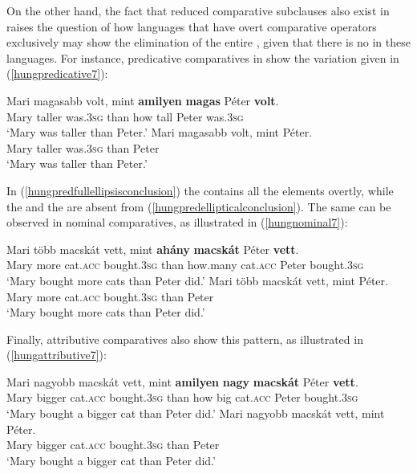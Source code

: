 On the other hand, the fact that reduced comparative subclauses also exist in  raises the question of how languages that have overt comparative operators exclusively may show the elimination of the entire , given that there is no  in these languages. For instance, predicative comparatives in  show the variation given in (\ref{hungpredicative7}):

\ea \label{hungpredicative7}
\ea \gll	Mari	magasabb volt, mint \textbf{amilyen} \textbf{magas} Péter \textbf{volt}. \label{hungpredfullellipsisconclusion}\\
Mary taller	was.\textsc{3sg} than	how	tall	Peter was.\textsc{3sg}\\
\glt `Mary was taller than Peter.'
\ex	\gll Mari	magasabb volt, mint	Péter. \label{hungpredellipticalconclusion}\\
Mary taller	was.\textsc{3sg} than	Peter\\
\glt `Mary was taller than Peter.'
\z
\z

In (\ref{hungpredfullellipsisconclusion}) the  contains all the elements overtly, while the  and the  are absent from (\ref{hungpredellipticalconclusion}). The same can be observed in nominal comparatives, as illustrated in (\ref{hungnominal7}):

\ea \label{hungnominal7}
\ea \gll Mari	több macskát vett, mint	\textbf{ahány} \textbf{macskát} Péter \textbf{vett}.\\
Mary more	cat.\textsc{acc} bought.\textsc{3sg} than	how.many cat.\textsc{acc} Peter bought.\textsc{3sg}\\
\glt `Mary bought more cats than Peter did.'
\ex \gll Mari	több macskát vett, mint	Péter. \label{hungnomellipticalconclusion}\\
Mary more	cat.\textsc{acc} bought.\textsc{3sg} than Peter\\
\glt `Mary bought more cats than Peter did.'
\z
\z

Finally, attributive comparatives also show this pattern, as illustrated in (\ref{hungattributive7}):

\ea \label{hungattributive7}
\ea	\gll Mari nagyobb macskát vett, mint \textbf{amilyen} \textbf{nagy} \textbf{macskát} Péter \textbf{vett}.\\
Mary bigger	cat.\textsc{acc} bought.\textsc{3sg} than how big cat.\textsc{acc} Peter bought.\textsc{3sg}\\
\glt `Mary bought a bigger cat than Peter did.'
\ex \gll Mari nagyobb	macskát	vett,	mint Péter. \label{hungattrellipticalconclusion}\\
Mary bigger	cat.\textsc{acc} bought.\textsc{3sg} than	Peter\\
\glt `Mary bought a bigger cat than Peter did.'
\z
\z

